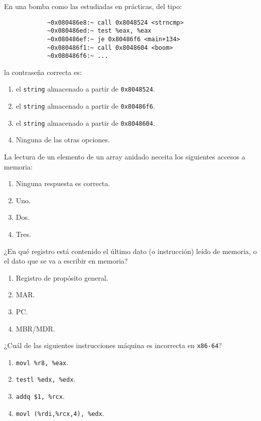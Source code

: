 \documentclass[12pt]{article}
\begin{document}
    \begin{ejercicio}
        En una bomba como las estudiadas en prácticas, del tipo:
        \begin{verbatim}
            ~0x080486e8:~ call 0x8048524 <strncmp>
            ~0x080486ed:~ test %eax, %eax
            ~0x080486ef:~ je 0x80486f6 <main+134>
            ~0x080486f1:~ call 0x8048604 <boom>
            ~0x080486f6:~ ...
        \end{verbatim}
        la contraseña correcta es:
        \begin{enumerate}[label=\alph*)]
            \item el \verb|string| almacenado  a partir de \verb|0x8048524|.
            \item el \verb|string| almacenado  a partir de \verb|0x80486f6|.
            \item el \verb|string| almacenado  a partir de \verb|0x8048604|.
            \item Ninguna de las otras opciones.
        \end{enumerate}
    \end{ejercicio}
    \begin{ejercicio}
        La lectura de un elemento de un array anidado neceita los siguientes accesos a memoria:
        \begin{enumerate}[label=\alph*)]
            \item Ninguna respuesta es correcta.
            \item Uno.
            \item Dos.
            \item Tres.
        \end{enumerate}
    \end{ejercicio}
    \begin{ejercicio}
        ¿En qué registro está contenido el último dato (o instrucción) leído de memoria, o el dato que se va a escribir en memoria?
        \begin{enumerate}[label=\alph*)]
            \item Registro de propósito general.
            \item MAR\@.
            \item PC\@.
            \item MBR/MDR\@.
        \end{enumerate}
    \end{ejercicio}
    \begin{ejercicio}
        ¿Cuál de las siguientes instrucciones máquina es incorrecta en \verb|x86-64|?
        \begin{enumerate}[label=\alph*)]
            \item \verb|movl %r8, %eax|.
            \item \verb|testl %edx, %edx|.
            \item \verb|addq $1, %rcx|.
            \item \verb|movl (%rdi,%rcx,4), %edx|.
        \end{enumerate}
    \end{ejercicio}
\end{document}
